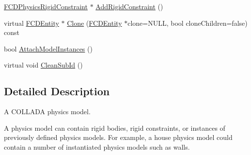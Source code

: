\begin{DoxyCompactItemize}
\item 
\hyperlink{classFCDPhysicsRigidConstraint}{FCDPhysicsRigidConstraint} $\ast$ \hyperlink{classFCDPhysicsModel_af9356bcbe4a27ef102a8e49d3cbab53e}{AddRigidConstraint} ()
\item 
virtual \hyperlink{classFCDEntity}{FCDEntity} $\ast$ \hyperlink{classFCDPhysicsModel_a8f50bef0284300f395efb6637ddce559}{Clone} (\hyperlink{classFCDEntity}{FCDEntity} $\ast$clone=NULL, bool cloneChildren=false) const 
\item 
bool \hyperlink{classFCDPhysicsModel_a7505505b8a1e5f1c4e0d74fe155a4c53}{AttachModelInstances} ()
\item 
virtual void \hyperlink{classFCDPhysicsModel_a2caafe253a23d7336c38fac68dea9579}{CleanSubId} ()
\end{DoxyCompactItemize}


\subsection{Detailed Description}
A COLLADA physics model.

A physics model can contain rigid bodies, rigid constraints, or instances of previously defined physics models. For example, a house physics model could contain a number of instantiated physics models such as walls. 

